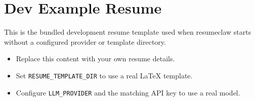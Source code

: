 \documentclass{article}
\begin{document}
\section*{Dev Example Resume}

This is the bundled development resume template used when resumeclaw starts
without a configured provider or template directory.

\begin{itemize}
  \item Replace this content with your own resume details.
  \item Set \texttt{RESUME\_TEMPLATE\_DIR} to use a real LaTeX template.
  \item Configure \texttt{LLM\_PROVIDER} and the matching API key to use a real model.
\end{itemize}
\end{document}
